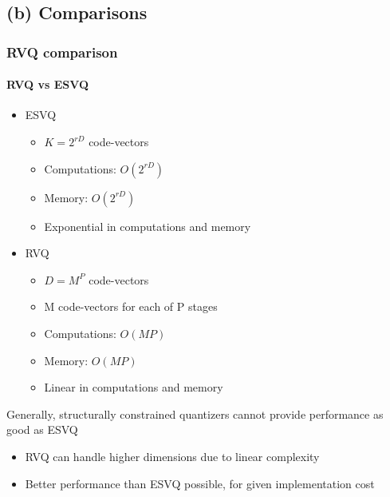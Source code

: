 \subsection{(b) Comparisons}
\begin{frame}
\frametitle{RVQ comparison}\logoCSIPCPL\mypagenum
\framesubtitle{RVQ vs ESVQ}
	\begin{itemize}
		\item ESVQ
			\begin{itemize}
				\item $K=2^{rD}$ code-vectors
				\item Computations: $O(2^{rD})$
				\item Memory: $O(2^{rD})$
				\item Exponential in computations and memory
			\end{itemize}
		\item RVQ
			\begin{itemize}
				\item $D={M^P}$ code-vectors
				\item M code-vectors for each of P stages
				\item Computations: $O(MP)$
				\item Memory: $O(MP)$
				\item Linear in computations and memory
			\end{itemize}
	\end{itemize}
	Generally, structurally constrained quantizers cannot provide performance as good as ESVQ
	\begin{itemize}
		\item RVQ can handle higher dimensions due to linear complexity
		\item Better performance than ESVQ possible, for given implementation cost
	\end{itemize}	
\end{frame}



